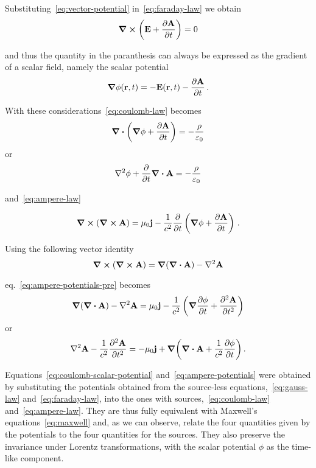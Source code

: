 \documentclass[class=report, crop=false]{standalone}
\begin{document}
Substituting~\eqref{eq:vector-potential} in~\eqref{eq:faraday-law} we obtain
\begin{equation}
  \label{eq:faraday-vector-potential}
  \curl(\vb{E} + \pdv{\vb{A}}{t}) = 0
\end{equation}

and thus the quantity in the paranthesis can always be expressed as the
gradient of a scalar field, namely the scalar potential
\[
\grad{\phi}(\vb{r}, t) = -\vb{E}(\vb{r}, t) - \pdv{\vb{A}}{t}\,.
\]

With these considerations~\eqref{eq:coulomb-law} becomes
\[
  \div(\grad{\phi} + \pdv{\vb{A}}{t}) = - \frac{\rho}{\varepsilon_0}
\]
or
\begin{equation}
  \label{eq:coulomb-scalar-potential}
  \laplacian{\phi} + \pdv{t}\div{\vb{A}} = - \frac{\rho}{\varepsilon_0}
\end{equation}

and~\eqref{eq:ampere-law}

\begin{equation}
  \label{eq:ampere-potentials-pre}
  \curl(\curl{\vb{A}}) = \mu_0 \vb{j}
    - \frac{1}{c^2} \pdv{t} \left( \grad{\phi} + \pdv{\vb{A}}{t} \right)\,.
\end{equation}

Using the following vector identity
\begin{equation}
  \label{eq:curl-of-curl}
  \curl(\curl{\vb{A}}) = \grad(\div{\vb{A}}) - \laplacian{\vb{A}}
\end{equation}

eq.~\eqref{eq:ampere-potentials-pre} becomes
\[
  \grad(\div{\vb{A}}) - \laplacian{\vb{A}} = \mu_0 \vb{j}
    - \frac{1}{c^2} \left( \grad{\pdv{\phi}{t}} + \pdv[2]{\vb{A}}{t} \right)
\]
or
\begin{equation}
  \label{eq:ampere-potentials}
  \laplacian{\vb{A}} - \frac{1}{c^2}\pdv[2]{\vb{A}}{t} =
    -\mu_0 \vb{j} + \grad(\div{\vb{A}} + \frac{1}{c^2} \pdv{\phi}{t})\,.
\end{equation}

Equations~\eqref{eq:coulomb-scalar-potential} and~\eqref{eq:ampere-potentials}
were obtained by substituting the potentials obtained from the source-less
equations,~\eqref{eq:gauss-law} and~\eqref{eq:faraday-law}, into the ones
with sources,~\eqref{eq:coulomb-law} and~\eqref{eq:ampere-law}. They are thus
fully equivalent with Maxwell's equations~\eqref{eq:maxwell} and, as we can observe,
relate the four quantities given by the potentials to the four quantities for the
sources. They also preserve the invariance under Lorentz transformations, with
the scalar potential \(\phi\) as the time-like component.
\end{document}
